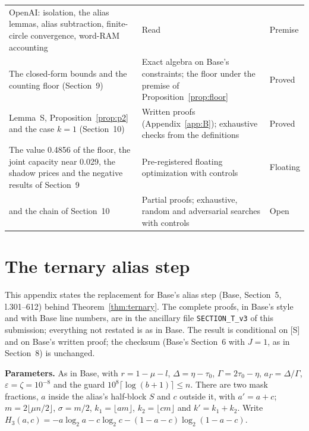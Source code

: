 \documentclass[11pt]{article}
\newcommand{\eps}{\varepsilon}
\theoremstyle{plain}
\begin{document}
{\begin{longtable}{@{}>{\raggedright\arraybackslash}p{4.2cm}>{\raggedright\arraybackslash}p{8.7cm}>{\raggedright\arraybackslash}p{2.6cm}@{}}
OpenAI: isolation, the alias lemmas, alias subtraction, finite-circle convergence, word-RAM accounting & Read & Premise \\
The closed-form bounds and the counting floor (Section~9) & Exact algebra on Base's constraints; the floor under the premise of Proposition~\ref{prop:floor} & Proved \\
Lemma~S, Proposition~\ref{prop:p2} and the case $k = 1$ (Section~10) & Written proofs (Appendix~\ref{app:B}); exhaustive checks from the definitions & Proved \\
The value 0.4856 of the floor, the joint capacity near 0.029, the shadow prices and the negative results of Section~9 & Pre-registered floating optimization with controls & Floating \\
{[S]} and the chain of Section~10 & Partial proofs; exhaustive, random and adversarial searches with controls & Open \\
\end{longtable}
}

\appendix

\section{The ternary alias step}\label{app:T}

This appendix states the replacement for Base's alias step (Base, Section~5, l.301--612) behind Theorem~\ref{thm:ternary}. The complete proofs, in Base's style and with Base line numbers, are in the ancillary file \texttt{SECTION\_T\_v3} of this submission; everything not restated is as in Base. The result is conditional on [S] and on Base's written proof; the checksum (Base's Section~6 with $J = 1$, as in Section~8) is unchanged.

\textbf{Parameters.} As in Base, with $r = 1 - \mu - l$, $\Delta = \eta - \tau_0$, $\Gamma = 2\tau_0 - \eta$, $a_\Gamma = \Delta/\Gamma$, $\eps = \zeta = 10^{-8}$ and the guard $10^8\lceil\log(b+1)\rceil \le n$. There are two mask fractions, $a$ inside the alias's half-block $S$ and $c$ outside it, with $a' = a + c$; $m = 2\lfloor \mu n/2 \rfloor$, $\sigma = m/2$, $k_1 = \lfloor am \rfloor$, $k_2 = \lfloor cm \rfloor$ and $k' = k_1 + k_2$. Write $H_3(a,c) = -a\log_2 a - c\log_2 c - (1-a-c)\log_2(1-a-c)$.
\end{document}
